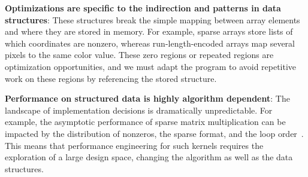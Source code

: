 %
%

\textbf{Optimizations are specific to the indirection and patterns in data structures}: 
%
These structures break the simple mapping between array elements and where they are stored in memory.
%
For example, sparse arrays store lists of which coordinates are nonzero, whereas run-length-encoded arrays map several pixels to the same color value. 
%
These zero regions or repeated regions are optimization opportunities, and we must adapt the program to avoid repetitive work on these regions by referencing the stored structure.

\textbf{Performance on structured data is highly algorithm dependent}: The landscape of implementation decisions is dramatically unpredictable. 
%
For example, the asymptotic performance of sparse matrix multiplication can be impacted by the distribution of nonzeros, the sparse format, and the loop order~\cite{ahrens2022autoscheduling, zhang2021gamma}. 
This means that performance engineering for such kernels requires the exploration of a large design space, changing the algorithm as well as the data structures.



